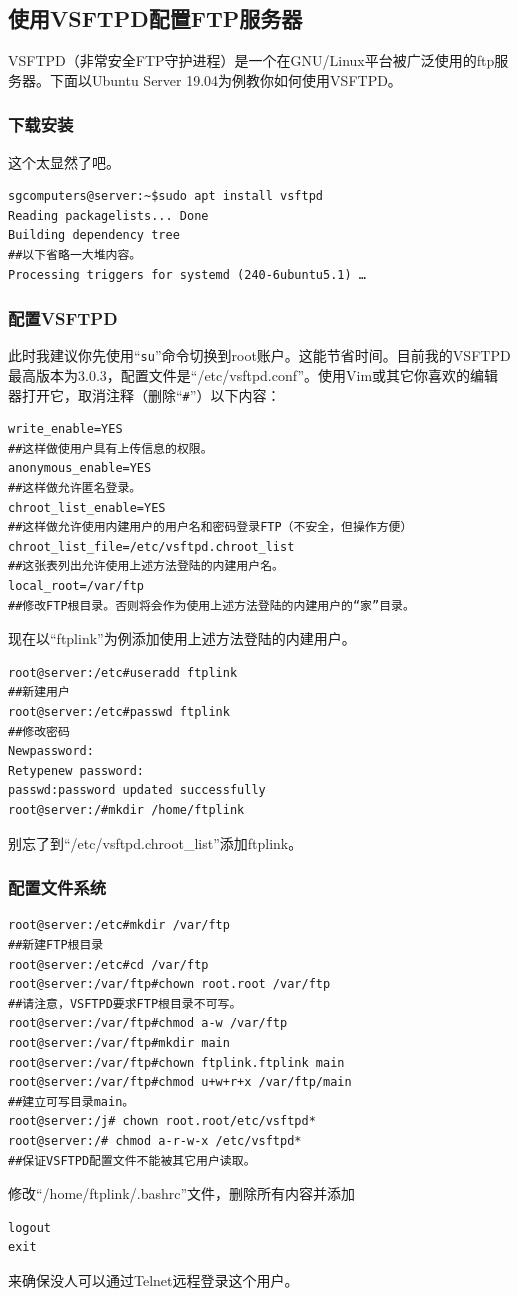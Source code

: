 \subsection{使用VSFTPD配置FTP服务器}
VSFTPD（非常安全FTP守护进程）是一个在GNU/Linux平台被广泛使用的ftp服务器。下面以Ubuntu Server 19.04为例教你如何使用VSFTPD。
\subsubsection{下载安装}
这个太显然了吧。
\begin{verbatim}
sgcomputers@server:~$sudo apt install vsftpd
Reading packagelists... Done
Building dependency tree
##以下省略一大堆内容。
Processing triggers for systemd (240-6ubuntu5.1) …
\end{verbatim}
\subsubsection{配置VSFTPD}
此时我建议你先使用“\verb|su|”命令切换到root账户。这能节省时间。目前我的VSFTPD最高版本为3.0.3，配置文件是“/etc/vsftpd.conf”。使用Vim或其它你喜欢的编辑器打开它，取消注释（删除“\verb|#|”）以下内容：
\begin{verbatim}
write_enable=YES
##这样做使用户具有上传信息的权限。
anonymous_enable=YES
##这样做允许匿名登录。
chroot_list_enable=YES
##这样做允许使用内建用户的用户名和密码登录FTP（不安全，但操作方便）
chroot_list_file=/etc/vsftpd.chroot_list
##这张表列出允许使用上述方法登陆的内建用户名。
local_root=/var/ftp
##修改FTP根目录。否则将会作为使用上述方法登陆的内建用户的“家”目录。
\end{verbatim}\par
现在以“ftplink”为例添加使用上述方法登陆的内建用户。
\begin{verbatim}
root@server:/etc#useradd ftplink
##新建用户
root@server:/etc#passwd ftplink
##修改密码
Newpassword:
Retypenew password:
passwd:password updated successfully
root@server:/#mkdir /home/ftplink
\end{verbatim}\par
别忘了到“/etc/vsftpd.chroot\_list”添加ftplink。
\subsubsection{配置文件系统}
\begin{verbatim}
root@server:/etc#mkdir /var/ftp
##新建FTP根目录
root@server:/etc#cd /var/ftp
root@server:/var/ftp#chown root.root /var/ftp
##请注意，VSFTPD要求FTP根目录不可写。
root@server:/var/ftp#chmod a-w /var/ftp
root@server:/var/ftp#mkdir main
root@server:/var/ftp#chown ftplink.ftplink main
root@server:/var/ftp#chmod u+w+r+x /var/ftp/main
##建立可写目录main。
root@server:/j# chown root.root/etc/vsftpd*
root@server:/# chmod a-r-w-x /etc/vsftpd*
##保证VSFTPD配置文件不能被其它用户读取。
\end{verbatim}\par
修改“/home/ftplink/.bashrc”文件，删除所有内容并添加
\begin{verbatim}
logout
exit
\end{verbatim}\par
来确保没人可以通过Telnet远程登录这个用户。
